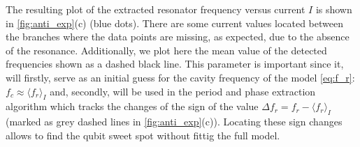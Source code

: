 \documentclass[%
 aip,
 amsmath,amssymb,
 reprint,%
]{revtex4-1}
\begin{document}
The resulting plot of the extracted resonator frequency versus current $I$ is shown in \autoref{fig:anti_exp}(c) (blue dots). There are some current values located between the branches where the data points are missing, as expected, due to the absence of the resonance. Additionally, we plot here the mean value of the detected frequencies shown as a dashed black line. This parameter is important since it, will firstly, serve as an initial guess for the cavity frequency of the model \eqref{eq:f_r}: $f_c \approx \langle f_r \rangle_{I}$ and, secondly, will be used in the period and phase extraction algorithm which tracks the changes of the sign of the value $\Delta f_r = f_r - \langle f_r \rangle_{I}$ (marked as grey dashed lines in \autoref{fig:anti_exp}(c)). Locating these sign changes allows to find the qubit sweet spot without fittig the full model.
\end{document}
